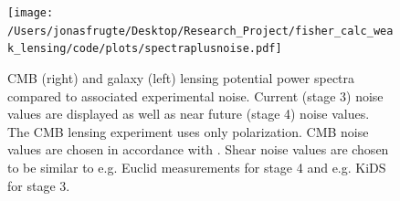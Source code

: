 \documentclass[11pt]{article} %
\begin{document}
\begin{figure}[t]
    \centering
    \texttt{[image: /Users/jonasfrugte/Desktop/Research\_Project/fisher\_calc\_weak\_lensing/code/plots/spectraplusnoise.pdf]}
    \caption{CMB (right) and galaxy (left) lensing potential power spectra compared to associated experimental noise. Current (stage 3) noise values are displayed as well as near future (stage 4) noise values. The CMB lensing experiment uses only polarization. CMB noise values are chosen in accordance with \cite{Namikawa_2016}. Shear noise values are chosen to be similar to e.g. Euclid measurements for stage 4 and e.g. KiDS for stage 3.}
    \label{fig:lpsplusnoise}
\end{figure}







\end{document}
